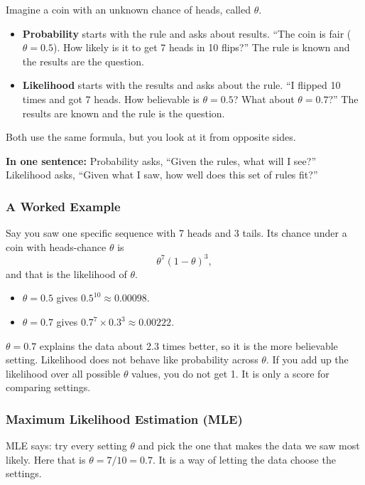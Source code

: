 Imagine a coin with an unknown chance of heads, called $\theta$.

\begin{itemize}
  \item \textbf{Probability} starts with the rule and asks about results. ``The coin is fair ($\theta = 0.5$). How likely is it to get 7 heads in 10 flips?'' The rule is known and the results are the question.
  \item \textbf{Likelihood} starts with the results and asks about the rule. ``I flipped 10 times and got 7 heads. How believable is $\theta = 0.5$? What about $\theta = 0.7$?'' The results are known and the rule is the question.
\end{itemize}

Both use the same formula, but you look at it from opposite sides.

\textbf{In one sentence:} Probability asks, ``Given the rules, what will I see?'' Likelihood asks, ``Given what I saw, how well does this set of rules fit?''

\subsubsection*{A Worked Example}

Say you saw one specific sequence with 7 heads and 3 tails. Its chance under a coin with heads-chance $\theta$ is
\[
\theta^{7}(1 - \theta)^{3},
\]
and that is the likelihood of $\theta$.

\begin{itemize}
  \item $\theta = 0.5$ gives $0.5^{10} \approx 0.00098$.
  \item $\theta = 0.7$ gives $0.7^{7} \times 0.3^{3} \approx 0.00222$.
\end{itemize}

$\theta = 0.7$ explains the data about 2.3 times better, so it is the more believable setting. Likelihood does not behave like probability across $\theta$. If you add up the likelihood over all possible $\theta$ values, you do not get 1. It is only a score for comparing settings.

\subsubsection*{Maximum Likelihood Estimation (MLE)}

MLE says: try every setting $\theta$ and pick the one that makes the data we saw most likely. Here that is $\theta = 7/10 = 0.7$. It is a way of letting the data choose the settings.

